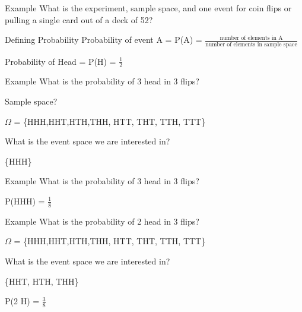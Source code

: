 \documentclass[presentation]{beamer}
\begin{document}
\begin{frame}[label={sec:org70258ad}]{Example}
What is the experiment, sample space, and one event for coin flips or pulling a single card out of a deck of 52?
\end{frame}

\begin{frame}[label={sec:orgaffde64}]{Defining Probability}
Probability of event A = P(A) = \(\frac{\text{number of elements in A}}{\text{number of elements in sample space}}\)

\pause

Probability of Head = P(H) = \(\frac{1}{2}\)
\end{frame}


\begin{frame}[label={sec:org46a88e8}]{Example}
What is the probability of 3 head in 3 flips?

Sample space?

\pause

\(\Omega\) = \{HHH,HHT,HTH,THH, HTT, THT, TTH, TTT\}

\pause

What is the event space we are interested in?

\pause

\{HHH\}
\end{frame}

\begin{frame}[label={sec:org893d0b8}]{Example}
What is the probability of 3 head in 3 flips?


\pause

P(HHH) = \(\frac{1}{8}\)
\end{frame}


\begin{frame}[label={sec:orged91783}]{Example}
What is the probability of 2 head in 3 flips?

\(\Omega\) = \{HHH,HHT,HTH,THH, HTT, THT, TTH, TTT\}

What is the event space we are interested in?

\pause

\{HHT, HTH, THH\}

\pause

P(2 H) = \(\frac{3}{8}\)
\end{frame}
\end{document}
